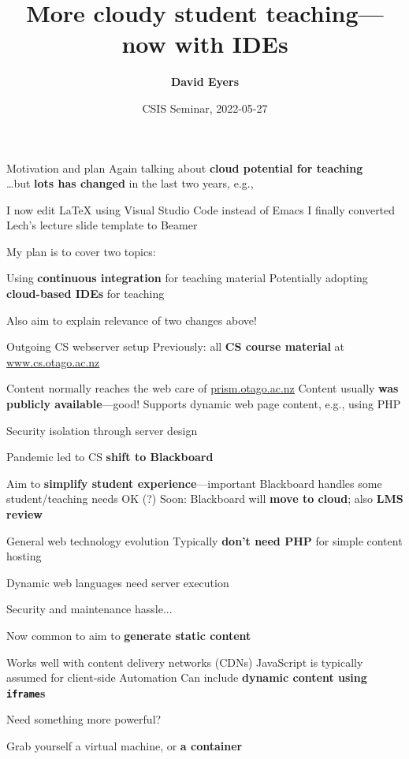 \documentclass[aspectratio=169,t]{beamer}
\title[2022-05-27---CSIS Seminar---David Eyers]{More cloudy student teaching---now with IDEs}
\date{CSIS Seminar, 2022-05-27}
\author{\textbf{David Eyers}}
\begin{document}
\begin{frame}
  \titlepage
\end{frame}

\begin{dframe}{Motivation and plan}
  \1 Again talking about \textbf{cloud potential for teaching}\\
     \dots but \textbf{lots has changed} in the last two years, e.g.,

  \2 I now edit \LaTeX{} using Visual Studio Code instead of Emacs
  \2 I finally converted Lech's lecture slide template to Beamer
  
  \medskip

  \1 My plan is to cover two topics:

  \2 Using \textbf{continuous integration} for teaching material
  \2 Potentially adopting \textbf{cloud-based IDEs} for teaching

  \medskip

  \1 Also aim to explain relevance of two changes above!

\end{dframe}

\begin{dframe}{Outgoing CS webserver setup}
  \1 Previously: all \textbf{CS course material} at \url{www.cs.otago.ac.nz}

  \2 Content normally reaches the web care of \url{prism.otago.ac.nz}
  \2 Content usually \textbf{was publicly available}---good!
  \2 Supports dynamic web page content, e.g., using PHP
  
  \3 Security isolation through server design

  \medskip

  \1 Pandemic led to CS \textbf{shift to Blackboard}

  \2 Aim to \textbf{simplify student experience}---important
  \2 Blackboard handles some student/teaching needs OK (?)
  \2 Soon: Blackboard will \textbf{move to cloud}; also \textbf{LMS review}
\end{dframe}

\begin{dframe}{General web technology evolution}
  \1 Typically \textbf{don't need PHP} for simple content hosting

  \2 Dynamic web languages need server execution
  
  \3 Security and maintenance hassle...

  \1 Now common to aim to \textbf{generate static content}

  \2 Works well with content delivery networks (CDNs)
  \2 JavaScript is typically assumed for client-side Automation
  \2 Can include \textbf{dynamic content using \texttt{iframe}s}

  \1 Need something more powerful?
  
  \2 Grab yourself a virtual machine, or \textbf{a container}
\end{dframe}
\end{document}
